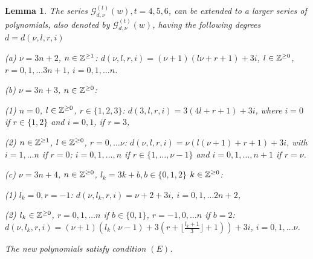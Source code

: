 \documentclass{birkjour_t2}
\newtheorem{lem}[thm]{Lemma}
\theoremstyle{definition}
\theoremstyle{remark}
\numberwithin{equation}{section}
\begin{document}
          \begin{lem} The series ${\mathcal{G}}^{(t)}_{d,\nu}(w), t=4,5,6$, can be extended to a larger series of polynomials, also denoted by ${\mathcal{G}}^{(t)}_{d,\nu}(w)$, having the following degrees $d=d(\nu, l, r, i)$
       \bigskip\par          
  (a)  $\nu= 3n+2$,  $n \in {\Bbb{Z}}^{\geq 1}$: $d(\nu, l, r, i)=(\nu+1)(l\nu + r+1) + 3i$,  $l \in {\Bbb{Z}}^{\geq 0}$,  $r=0,1,\dots 3n+1$, $i=0,1,\dots n$.
        \bigskip\par 
  (b) $\nu= 3n+3$,  $n \in {\Bbb{Z}}^{\geq 0}$:
  
  (1) $n=0$, $l \in {\Bbb{Z}}^{\geq 0}$, $r \in \{1,2,3\}$: $d(3, l, r, i)= 3(4l+r+1)+3i$, where $i=0$ if $r \in \{1,2\}$ and $i=0,1$, if $r=3$,
  
  (2) $n \in {\Bbb{Z}}^{\geq 1}$, $l \in {\Bbb{Z}}^{\geq 0}$, $r=0, \dots \nu$: $d(\nu, l, r, i)=\nu(l(\nu +1)+r+1)+ 3i$, with  $i=1,\dots n$ if $r=0$;  $i=0,1,\dots, n$ if $r \in \{1, \dots , \nu-1\}$ and $i=0,1,\dots, n+1$ if $r= \nu$.
      \bigskip\par 
  (c) $\nu= 3n+4$,  $n \in {\Bbb{Z}}^{\geq 0}$, $l_{k}=3k+b, b\in \{ 0, 1, 2 \}$ $k \in {\Bbb{Z}}^{\geq 0}$: 
  
  (1)  $l_{k}=0, r=-1$:  $d(\nu, l_{k}, r, i)= \nu +2+3i$, $i=0,1,\dots 2n+2$,
  
  (2) $l_{k}  \in {\Bbb{Z}}^{\geq 0}$, $r=0,1,\dots n$ if $b\in \{ 0, 1 \}$, $r=-1,0,\dots n$ if $b=2$: $d(\nu, l_{k}, r, i)=(\nu +1)(l_{k} (\nu-1)+3(r+\lfloor\frac{l_{k}+1}{3}\rfloor +1))+ 3i$, $i=0,1,\dots \nu$.
          
  The  new polynomials satisfy condition $(E)$.
  \end{lem}
\end{document}
